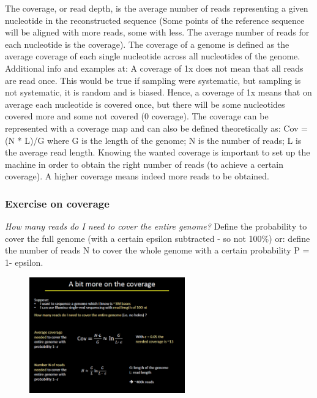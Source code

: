 The coverage, or read depth, is the average number of reads representing a given nucleotide in the reconstructed sequence (Some points of the reference sequence will be aligned with more reads, some with less. The average number of reads for each nucleotide is the coverage). 
The coverage of a genome is defined as the average coverage of each single nucleotide across all nucleotides of the genome. Additional info and examples at:  
A coverage of 1x does not mean that all reads are read once. This would be true if sampling were systematic, but sampling is not systematic, it is random and is biased. Hence, a coverage of 1x means that on average each nucleotide is covered once, but there will be some nucleotides covered more and some not covered (0 coverage). 
The coverage can be represented with a coverage map and can also be defined theoretically as:
Cov = (N * L)/G
where G is the length of the genome; N is the  number of reads; L is the average read length.
Knowing the wanted coverage is important to set up the machine in order to obtain the right number of reads (to achieve a certain coverage). A higher coverage means indeed more reads to be obtained. 

\subsubsection{Exercise on coverage}

\emph{How many reads do I need to cover the entire genome?}
Define the probability  to cover the full genome (with a certain epsilon subtracted - so not 100$\%$) or: define the number of reads N to cover the whole genome with a certain probability P = 1- epsilon.

\begin{figure}[h]
\centering
\includegraphics[width=0.6\textwidth]{coverage.png}
\caption{}
\end{figure}

